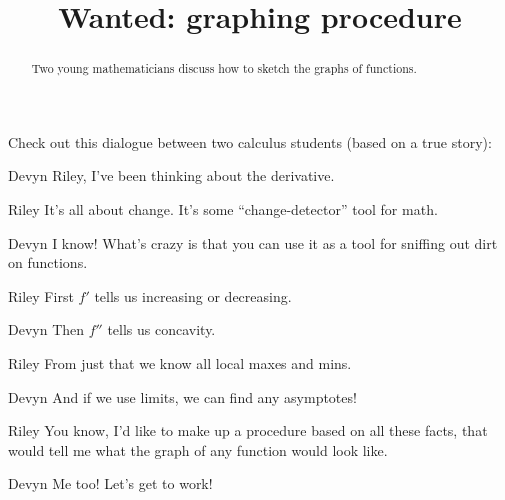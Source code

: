 \documentclass{ximera}
\title[Break-Ground:]{Wanted: graphing procedure}
\begin{document}
\begin{abstract}
Two young mathematicians discuss how to sketch the graphs of functions.
\end{abstract}
\maketitle

Check out this dialogue between two calculus students (based on a true
story):

\begin{dialogue}
\item[Devyn] Riley, I've been thinking about the derivative. 
\item[Riley] It's all about change. It's some ``change-detector'' tool
  for math.
\item[Devyn] I know!  What's crazy is that you can use it as a tool
  for sniffing out dirt on functions.
\item[Riley] First $f'$ tells us increasing or decreasing.
\item[Devyn] Then $f''$ tells us concavity.
\item[Riley] From just that we know all local maxes and mins.
\item[Devyn] And if we use limits, we can find any asymptotes!
\item[Riley] You know, I'd like to make up a procedure based on all
  these facts, that would tell me what the graph of any function would look like.
\item[Devyn] Me too! Let's get to work!
\end{dialogue}
\end{document}
